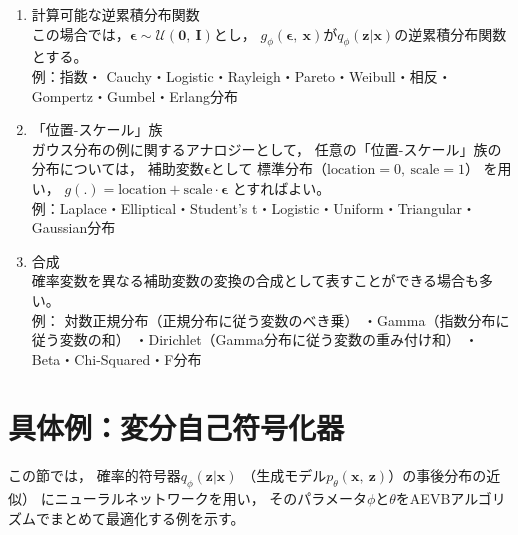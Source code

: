 \documentclass[dvipdfmx, fleqn]{jsarticle}
\begin{document}
\begin{enumerate}
    \item 計算可能な逆累積分布関数 \\
        この場合では，\(\bm{\epsilon} \sim \mathcal{U}(\bm{0},\ \bm{I})\)とし，
        \(g_{\phi} (\bm{\epsilon},\ \bm{x})\)が\(q_{\phi} (\bm{z} | \bm{x})\)の逆累積分布関数とする。\\
        例：指数・ Cauchy・Logistic・Rayleigh・Pareto・Weibull・相反・Gompertz・Gumbel・Erlang分布
    \item 「位置-スケール」族 \\
        ガウス分布の例に関するアナロジーとして，
        任意の「位置-スケール」族の分布については，
        補助変数\(\bm{\epsilon}\)として
        標準分布（\(\mathrm{location} = 0,\ \mathrm{scale} = 1\)）
        を用い，
        \(g(.) = \mathrm{location} + \mathrm{scale} \cdot \bm{\epsilon}\)
        とすればよい。 \\
        例：Laplace・Elliptical・Student’s t・Logistic・Uniform・Triangular・Gaussian分布
    \item 合成 \\
        確率変数を異なる補助変数の変換の合成として表すことができる場合も多い。 \\
        例：
            対数正規分布（正規分布に従う変数のべき乗）
            ・Gamma（指数分布に従う変数の和）
            ・Dirichlet（Gamma分布に従う変数の重み付け和）
            ・ Beta・Chi-Squared・F分布
\end{enumerate}



\section{具体例：変分自己符号化器}

この節では，
確率的符号器\(q_{\phi} (\bm{z} | \bm{x})\)
（生成モデル\(p_{\theta} (\bm{x},\ \bm{z})\)）の事後分布の近似）
にニューラルネットワークを用い，
そのパラメータ\(\phi\)と\(\theta\)をAEVBアルゴリズムでまとめて最適化する例を示す。
\end{document}
